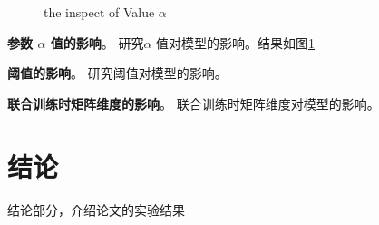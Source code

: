 \documentclass[lang=cn,11pt]{elegantpaper}
\begin{document}
\begin{figure}[tbp]
	\centering
	\quad
	\quad
	\quad
	\caption{ the inspect of Value $ \alpha $\label{fig:alpha}} 
\end{figure}



\textbf{参数 $ \alpha $ 值的影响}。 研究$ \alpha $ 值对模型的影响。结果如图\ref{fig:alpha}

\textbf{阈值的影响}。 研究阈值对模型的影响。

\textbf{联合训练时矩阵维度的影响}。 联合训练时矩阵维度对模型的影响。


\section{结论}
结论部分，介绍论文的实验结果



\end{document}
